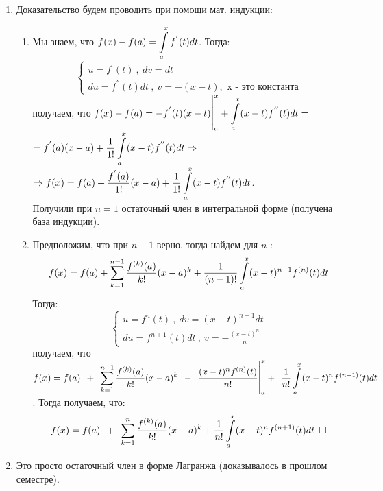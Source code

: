 \documentclass[a4paper,12pt]{article} %
\begin{document}
\begin{enumerate}
\item Доказательство будем проводить при помощи мат. индукции:
\begin{enumerate}
	\item Мы знаем, что $\Large \displaystyle f(x) - f(a) = \int\limits_{a}^{x} f^{'}(t)dt$. Тогда:
	\begin{equation*}
		\begin{cases}
			u = f^{'}(t)\ ,\ dv = dt\\
			du = f^{''}(t)dt\ ,\ v = -(x-t), \text{ x - это константа}
		\end{cases}
	\end{equation*}
	получаем, что $\Large \displaystyle f(x) - f(a) = -f^{'}(t)(x-t) \bigg|_a^x + \int\limits_a^x (x-t) f^{''}(t)dt = $\\
	$\Large \displaystyle = f^{'}(a)(x-a) + \frac{1}{1!} \int\limits_a^x (x-t) f^{''}(t)dt \Rightarrow$\\
	$\Rightarrow \Large \displaystyle  f(x) = f(a) + \frac{f^{'}(a)}{1!}(x-a) + \frac{1}{1!} \int\limits_a^x (x-t) f^{''}(t)dt$.\\
	Получили при $n = 1$ остаточный член в интегральной форме (получена база индукции).
	\item Предположим, что при $n - 1$ верно, тогда найдем для $n$ :
	\begin{equation*}
		\Large \displaystyle f(x) = f(a) + \sum\limits_{k = 1}^{n - 1} \frac{f^{(k)}(a)}{k!}(x-a)^k + \frac{1}{(n-1)!}\int\limits_a^x (x-t)^{n - 1} f^{(n)}(t)dt
	\end{equation*}
	Тогда:
	\begin{equation*}
		\begin{cases}
			u = f^{n}(t)\ ,\ dv = (x-t)^{n-1}dt\\
			du = f^{n + 1}(t)dt\ ,\ v = -\frac{(x-t)^n}{n}
		\end{cases}
	\end{equation*}
	получаем, что $\Large \displaystyle f(x) = f(a)\ +\ \sum\limits_{k = 1}^{n - 1} \frac{f^{(k)}(a)}{k!}(x-a)^k\ -\ \frac{(x-t)^n f^{(n)}(t)}{n!} \bigg|_a^x +\ \frac{1}{n!} \int\limits_a^x (x-t)^n f^{(n+1)}(t)dt$. Тогда получаем, что:
	\begin{equation*}
		\Large \displaystyle f(x) = f(a)\ +\ \sum\limits_{k = 1}^{n} \frac{f^{(k)}(a)}{k!}(x-a)^k + \frac{1}{n!} \int\limits_a^x (x-t)^n f^{(n+1)}(t)dt \ \square
	\end{equation*}
	
\end{enumerate}
\item Это просто остаточный член в форме Лагранжа (доказывалось в прошлом семестре).
\end{enumerate}
\end{document}
